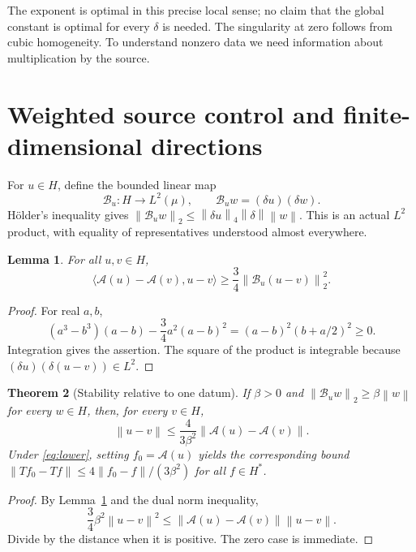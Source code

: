 \documentclass[11pt]{article}
\newtheorem{theorem}{Theorem}[section]
\newtheorem{lemma}[theorem]{Lemma}
\theoremstyle{remark}\newtheorem{remark}[theorem]{Remark}
\newcommand{\norm}[1]{\left\lVert#1\right\rVert}
\newcommand{\pair}[2]{\langle #1,#2\rangle}
\newcommand{\A}{\mathcal A}
\newcommand{\B}{\mathcal B}
\begin{document}
The exponent is optimal in this precise local sense; no claim that
the global constant is optimal for every $\delta$ is needed. The
singularity at zero follows from cubic homogeneity. To understand
nonzero data we need information about multiplication by the source.

\section{Weighted source control and finite-dimensional directions}
For $u\in H$, define the bounded linear map
\begin{equation}\label{eq:weighted}
 \B_u:H\to L^2(\mu),\qquad \B_uw=(\delta u)(\delta w).
\end{equation}
H\"older's inequality gives
$\norm{\B_uw}_2\leq\norm{\delta u}_4\norm\delta\norm w$.
This is an actual $L^2$ product, with equality of representatives
understood almost everywhere.

\begin{lemma}\label{lem:weighted}
For all $u,v\in H$,
\begin{equation}\label{eq:wmono}
 \pair{\A(u)-\A(v)}{u-v}\geq\frac34\norm{\B_u(u-v)}_2^2.
\end{equation}
\end{lemma}
\begin{proof}
For real $a,b$,
\[
 (a^3-b^3)(a-b)-\frac34a^2(a-b)^2
 =(a-b)^2(b+a/2)^2\geq0.
\]
Integration gives the assertion. The square of the product is
integrable because $(\delta u)(\delta(u-v))\in L^2$.
\end{proof}

\begin{theorem}[Stability relative to one datum]\label{thm:weighted}
If $\beta>0$ and $\norm{\B_uw}_2\geq\beta\norm w$ for every $w\in H$,
then, for every $v\in H$,
\begin{equation}\label{eq:linear}
 \norm{u-v}\leq\frac4{3\beta^2}\norm{\A(u)-\A(v)}.
\end{equation}
Under \eqref{eq:lower}, setting $f_0=\A(u)$ yields the corresponding
bound $\norm{Tf_0-Tf}\leq4\norm{f_0-f}/(3\beta^2)$ for all $f\in H^*$.
\end{theorem}
\begin{proof}
By Lemma~\ref{lem:weighted} and the dual norm inequality,
\[
 \frac34\beta^2\norm{u-v}^2
 \leq\norm{\A(u)-\A(v)}\norm{u-v}.
\]
Divide by the distance when it is positive. The zero case is immediate.
\end{proof}
\end{document}
